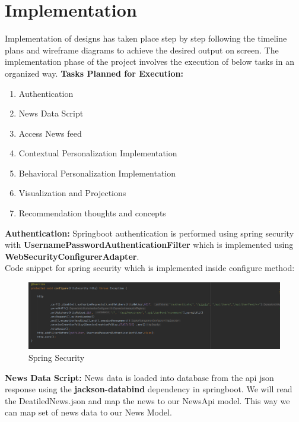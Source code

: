 \chapter{Implementation}

Implementation of designs has taken place step by step following the timeline plans and wireframe diagrams to achieve the desired output on screen. 
The implementation phase of the project involves the execution of below tasks in an organized way. \newline
\textbf{Tasks Planned for Execution:}
    \begin{enumerate}
        \item Authentication
        \item News Data Script
        \item Access News feed
        \item Contextual Personalization Implementation
        \item Behavioral Personalization Implementation
        \item Visualization and Projections
        \item Recommendation thoughts and concepts
        
    \end{enumerate}
\textbf{Authentication:} \newline
Springboot authentication is performed using spring security with \textbf{UsernamePasswordAuthenticationFilter} which is implemented using \textbf{WebSecurityConfigurerAdapter}. \\
Code snippet for spring security which is implemented inside configure method:  \newline

 \begin{figure}[h!]
     \begin{center}
    \includegraphics[width = \linewidth]{images/security.PNG} 
  \end{center}
\centering \caption{Spring Security}
\end{figure}

\textbf{News Data Script:} \newline
    News data is loaded into database from the api json response using the \textbf{jackson-databind} dependency in springboot. We will read the DeatiledNews.json and map the news to our NewsApi model. This way we can map set of news data to our News Model.
    
